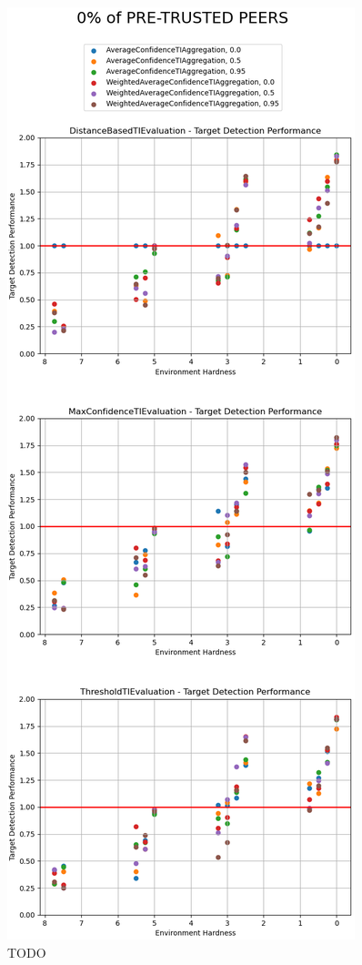 \label{subsubsec:target-detection-performance}
\begin{figure}[hp]
    \centering
    \includegraphics[height=0.95\textheight]{assets/0_target_detection.png}
    \caption{TODO}
    \label{fig:0-target-detection}
\end{figure}

